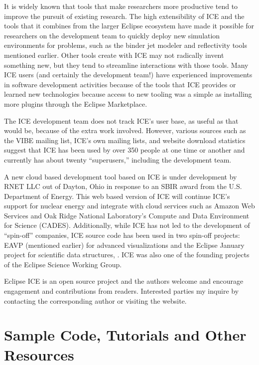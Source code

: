 It is widely known that tools that make researchers more productive tend
to improve the pursuit of existing research. The high extensibility of
ICE and the tools that it combines from the larger Eclipse ecosystem
have made it possible for researchers on the development team to quickly
deploy new simulation environments for problems, such as the binder jet
modeler and reflectivity tools mentioned earlier. Other tools create
with ICE may not radically invent something new, but they tend to
streamline interactions with those tools. Many ICE users (and certainly
the development team!) have experienced improvements in software
development activities because of the tools that ICE provides or learned
new technologies because access to new tooling was a simple as
installing more plugins through the Eclipse Marketplace.

The ICE development team does not track ICE's user base, as useful as
that would be, because of the extra work involved. However, various
sources such as the VIBE mailing list, ICE's own mailing lists, and
website download statistics suggest that ICE has been used by over 350
people at one time or another and currently has about twenty
``superusers,'' including the development team.

A new cloud based development tool based on ICE is under development by
RNET LLC out of Dayton, Ohio in response to an SBIR award from the U.S.
Department of Energy. This web based version of ICE will continue ICE's
support for nuclear energy and integrate with cloud services such as
Amazon Web Services and Oak Ridge National Laboratory's Compute and Data
Environment for Science (CADES). Additionally, while ICE has not led to
the development of ``spin-off'' companies, ICE source code has been used
in two spin-off projects: EAVP (mentioned earlier) for advanced
visualizations and the Eclipse January project for scientific data
structures, \cite{graham_eclipse_2016}. ICE was also one of the founding
projects of the Eclipse Science Working Group.

Eclipse ICE is an open source project and the authors welcome and encourage
engagement and contributions from readers. Interested parties my inquire by
contacting the corresponding author or visiting the website.

\section{Sample Code, Tutorials and Other
Resources}\label{sample-code-tutorials-and-other-resources}

